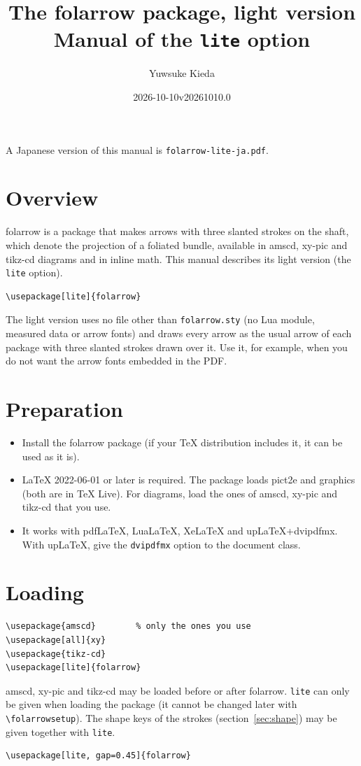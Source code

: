\documentclass[dvipdfmx,a4paper]{article}
\title{The folarrow package, light version\\\large Manual of the \texttt{lite} option}
\author{Yuwsuke Kieda}
\date{2026-10-10\quad v20261010.0}
\newcommand\pkg[1]{\textsf{#1}}
\newcommand\file[1]{\texttt{#1}}
\begin{document}
\maketitle

\noindent A Japanese version of this manual is \file{folarrow-lite-ja.pdf}.

\section{Overview}

\pkg{folarrow} is a package that makes arrows with three slanted strokes on the shaft, which
denote the projection of a foliated bundle, available in \pkg{amscd}, \pkg{xy-pic} and
\pkg{tikz-cd} diagrams and in inline math. This manual describes its light version (the
\texttt{lite} option).
\begin{Verbatim}
\usepackage[lite]{folarrow}
\end{Verbatim}
The light version uses no file other than \file{folarrow.sty} (no Lua module, measured data or
arrow fonts) and draws every arrow as the usual arrow of each package with three slanted strokes
drawn over it. Use it, for example, when you do not want the arrow fonts embedded in the PDF.

\section{Preparation}

\begin{itemize}
\item Install the \pkg{folarrow} package (if your \TeX{} distribution includes it, it can be used
  as it is).
\item \LaTeX{} 2022-06-01 or later is required. The package loads \pkg{pict2e} and \pkg{graphics}
  (both are in \TeX{} Live). For diagrams, load the ones of \pkg{amscd}, \pkg{xy-pic} and
  \pkg{tikz-cd} that you use.
\item It works with pdf\LaTeX, Lua\LaTeX, Xe\LaTeX{} and up\LaTeX{}+dvipdfmx. With up\LaTeX, give
  the \texttt{dvipdfmx} option to the document class.
\end{itemize}

\section{Loading}

\begin{Verbatim}
\usepackage{amscd}        % only the ones you use
\usepackage[all]{xy}
\usepackage{tikz-cd}
\usepackage[lite]{folarrow}
\end{Verbatim}
\pkg{amscd}, \pkg{xy-pic} and \pkg{tikz-cd} may be loaded before or after \pkg{folarrow}.
\texttt{lite} can only be given when loading the package (it cannot be changed later with
\verb|\folarrowsetup|). The shape keys of the strokes (section~\ref{sec:shape}) may be given
together with \texttt{lite}.
\begin{Verbatim}
\usepackage[lite, gap=0.45]{folarrow}
\end{Verbatim}
\end{document}
